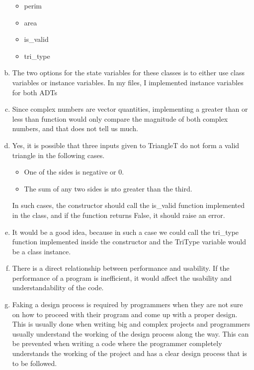 \documentclass[12pt]{article}
\begin{document}
\begin{enumerate}[(a)]
\begin{itemize}
\item perim

\item area

\item is\_valid

\item tri\_type

\end{itemize}

\item The two options for the state variables for these classes is to either use class variables or instance variables. In my files, I implemented instance variables for both ADTs

\item Since complex numbers are vector quantities, implementing a greater than or less than function would only compare the magnitude of both complex numbers, and that does not tell us much.

\item Yes, it is possible that three inputs given to TriangleT do not form a valid triangle in the following cases.

\begin{itemize}

\item One of the sides is negative or 0.

\item The sum of any two sides is nto greater than the third.

\end{itemize}

\noindent In such cases, the constructor should call the is\_valid function implemented in the class, and if the function returns False, it should raise an error.

\item It would be a good idea, because in such a case we could call the tri\_type function implemented inside the constructor and the TriType variable would be a class instance.

\item There is a direct relationship between performance and usability. If the performance of a program is inefficient, it would affect the usability and understandability of the code.

\item Faking a design process is required by programmers when they are not sure on how to proceed with their program and come up with a proper design. This is usually done when writing big and complex projects and programmers usually understand the working of the design process along the way. This can be prevented when writing a code where the programmer completely understands the working of the project and has a clear design process that is to be followed.


\end{enumerate}
\end{document}
